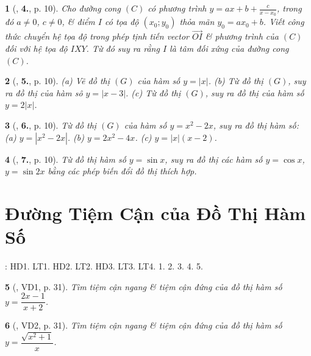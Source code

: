 \documentclass{article}
\newtheorem{baitoan}{}
\begin{document}
\begin{baitoan}[\cite{TLCT_giai_tich_12}, \textbf{4.}, p. 10]
	Cho đường cong $(C)$ có phương trình $y = ax + b + \frac{c}{x - x_0}$, trong đó $a\ne 0$, $c\ne 0$, \& điểm $I$ có tọa độ $(x_0;y_0)$ thỏa mãn $y_0 = ax_0 + b$. Viết công thức chuyển hệ tọa độ trong phép tịnh tiến vector $\overrightarrow{OI}$ \& phương trình của $(C)$ đối với hệ tọa độ $IXY$. Từ đó suy ra rằng $I$ là tâm đối xứng của đường cong $(C)$.
\end{baitoan}

\begin{baitoan}[\cite{TLCT_giai_tich_12}, \textbf{5.}, p. 10]
	(a) Vẽ đồ thị $(G)$ của hàm số $y = |x|$. (b) Từ đồ thị $(G)$, suy ra đồ thị của hàm sô $y = |x - 3|$. (c) Từ đồ thị $(G)$, suy ra đồ thị của hàm số $y = 2|x|$.
\end{baitoan}

\begin{baitoan}[\cite{TLCT_giai_tich_12}, \textbf{6.}, p. 10]
	Từ đồ thị $(G)$ của hàm số $y = x^2 - 2x$, suy ra đồ thị hàm số: (a) $y = |x^2 - 2x|$. (b) $y = 2x^2 - 4x$. (c) $y = |x|(x - 2)$.
\end{baitoan}

\begin{baitoan}[\cite{TLCT_giai_tich_12}, \textbf{7.}, p. 10]
	Từ đồ thị hàm số $y = \sin x$, suy ra đồ thị các hàm số $y = \cos x$, $y = \sin 2x$ bằng các phép biến đổi đồ thị thích hợp.
\end{baitoan}


\section{Đường Tiệm Cận của Đồ Thị Hàm Số}
\cite[Chap. I, \S3, pp. 21--27]{SGK_Toan_12_Canh_Dieu_tap_1}: HD1. LT1. HD2. LT2. HD3. LT3. LT4. 1. 2. 3. 4. 5.

\begin{baitoan}[\cite{SGK_Toan_12_giai_tich_nang_cao}, VD1, p. 31]
	Tìm tiệm cận ngang \& tiệm cận đứng của đồ thị hàm số $y = \dfrac{2x - 1}{x + 2}$.
\end{baitoan}

\begin{baitoan}[\cite{SGK_Toan_12_giai_tich_nang_cao}, VD2, p. 31]
	Tìm tiệm cận ngang \& tiệm cận đứng của đồ thị hàm số $y = \dfrac{\sqrt{x^2 + 1}}{x}$.
\end{baitoan}
\end{document}
